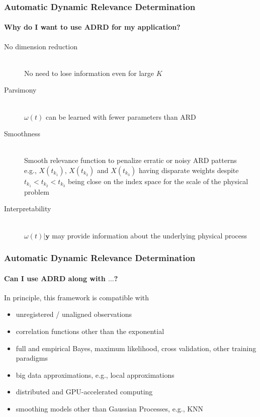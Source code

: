 \documentclass{snedecorbeamer}
\begin{document}
\begin{frame}
  \frametitle{Automatic Dynamic Relevance Determination}
  \framesubtitle{Why do I want to use \textsc{ADRD} for my application?}

  \begingroup
  \begin{description}
  \item[No dimension reduction] \mbox{}\\
    No need to lose information even for large $K$
  \item[Parsimony] \mbox{}\\
    $\omega(t)$ can be learned with fewer parameters than \textsc{ARD}
  \item[Smoothness] \mbox{}\\
    Smooth relevance function to penalize erratic or noisy \textsc{ARD} patterns
    \\
    e.g., $X(t_{k_1})$, $X(t_{k_2})$ and
    $X(t_{k_3})$ having disparate weights despite $t_{k_1} < t_{k_2} <
    t_{k_3}$ being close on the index space for the scale of the physical
    problem
  \item[Interpretability] \mbox{}\\
    $\omega(t) | \mathbf{y}$ may provide information about the underlying
    physical process
  \end{description}
  \endgroup
\end{frame}

\begin{frame}
  \frametitle{Automatic Dynamic Relevance Determination}
  \framesubtitle{Can I use \textsc{ADRD} along with $\dots$?}

  In principle, this framework is compatible with
  \begin{itemize}
  \item unregistered / unaligned observations
  \item correlation functions other than the exponential
  \item full and empirical Bayes, maximum likelihood, cross validation,
    other training paradigms
  \item big data approximations, e.g., local approximations
  \item distributed and GPU-accelerated computing
  \item smoothing models other than Gaussian Processes, e.g., KNN
  \end{itemize}
\end{frame}
\end{document}
